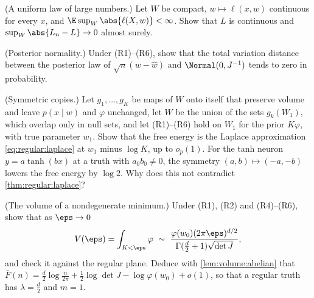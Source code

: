 \begin{refsection}
\begin{exercises}
\item \consolidation (A uniform law of large numbers.) Let $W$ be compact, $w\mapsto\ell(x,w)$ continuous for every $x$, and $\E\sup_W\abs{\ell(X,w)}<\infty$. Show that $L$ is continuous and $\sup_W\abs{L_n-L}\to0$ almost surely. \label{ex:regular:ulln}

\item \consolidation (Posterior normality.) Under (R1)--(R6), show that the total variation distance between the posterior law of $\sqrt n(w-\hat w)$ and $\Normal(0,J^{-1})$ tends to zero in probability. \label{ex:regular:bvm}

\item \consolidation (Symmetric copies.) Let $g_1,\dots,g_K$ be maps of $W$ onto itself that preserve volume and leave $p(x\mid w)$ and $\varphi$ unchanged, let $W$ be the union of the sets $g_k(W_1)$, which overlap only in null sets, and let (R1)--(R6) hold on $W_1$ for the prior $K\varphi$, with true parameter $w_1$. Show that the free energy is the Laplace approximation \eqref{eq:regular:laplace} at $w_1$ minus $\log K$, up to $o_p(1)$. For the tanh neuron $y=a\tanh(bx)$ at a truth with $a_0b_0\ne0$, the symmetry $(a,b)\mapsto(-a,-b)$ lowers the free energy by $\log2$. Why does this not contradict \cref{thm:regular:laplace}?\label{ex:regular:copies}

\item \consolidation (The volume of a nondegenerate minimum.) Under (R1), (R2) and (R4)--(R6), show that as $\eps\to0$
\[
V(\eps)=\int_{K<\eps}\varphi\ \sim\ \frac{\varphi(w_0)(2\pi\eps)^{d/2}}{\Gamma(\frac d2+1)\sqrt{\det J}},
\]
and check it against the regular plane. Deduce with \cref{lem:volume:abelian} that $\bar F(n)=\frac d2\log\frac n{2\pi}+\frac12\log\det J-\log\varphi(w_0)+o(1)$, so that a regular truth has $\lambda=\frac d2$ and $m=1$. \label{ex:regular:volume}


\end{exercises}
\end{refsection}
